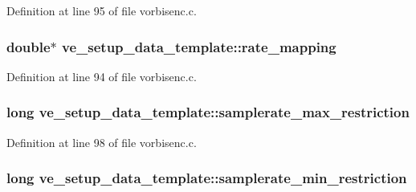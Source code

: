Definition at line 95 of file vorbisenc.\+c.

\subsubsection[{\texorpdfstring{rate\+\_\+mapping}{rate_mapping}}]{ double$\ast$ ve\+\_\+setup\+\_\+data\+\_\+template\+::rate\+\_\+mapping}\hypertarget{structve__setup__data__template_a7a0d9b35ef99f3fa83223093f7d4d8c3}{}\label{structve__setup__data__template_a7a0d9b35ef99f3fa83223093f7d4d8c3}


Definition at line 94 of file vorbisenc.\+c.

\subsubsection[{\texorpdfstring{samplerate\+\_\+max\+\_\+restriction}{samplerate_max_restriction}}]{\setlength{\rightskip}{0pt plus 5cm}long ve\+\_\+setup\+\_\+data\+\_\+template\+::samplerate\+\_\+max\+\_\+restriction}\hypertarget{structve__setup__data__template_af5709bcc9b67d6f832f0d25f41615a0c}{}\label{structve__setup__data__template_af5709bcc9b67d6f832f0d25f41615a0c}


Definition at line 98 of file vorbisenc.\+c.

\subsubsection[{\texorpdfstring{samplerate\+\_\+min\+\_\+restriction}{samplerate_min_restriction}}]{\setlength{\rightskip}{0pt plus 5cm}long ve\+\_\+setup\+\_\+data\+\_\+template\+::samplerate\+\_\+min\+\_\+restriction}\hypertarget{structve__setup__data__template_ae6fea757e163c4adc1474593663cba5b}{}\label{structve__setup__data__template_ae6fea757e163c4adc1474593663cba5b}


